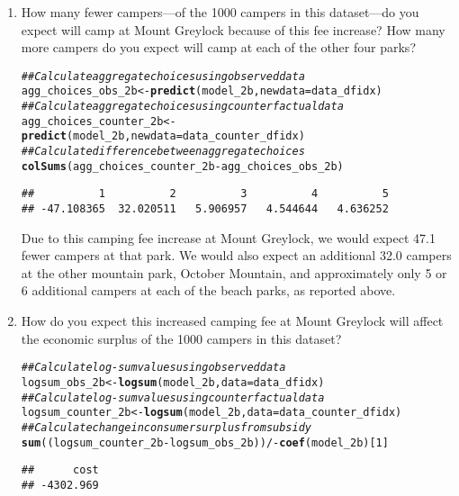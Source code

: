 \documentclass[11pt,letterpaper]{article}\usepackage[]{graphicx}\usepackage[]{color}
\makeatletter
\newcommand{\hlnum}[1]{\textcolor[rgb]{0.686,0.059,0.569}{#1}}%
\newcommand{\hlcom}[1]{\textcolor[rgb]{0.678,0.584,0.686}{\textit{#1}}}%
\newcommand{\hlopt}[1]{\textcolor[rgb]{0,0,0}{#1}}%
\newcommand{\hlstd}[1]{\textcolor[rgb]{0.345,0.345,0.345}{#1}}%
\newcommand{\hlkwb}[1]{\textcolor[rgb]{0.69,0.353,0.396}{#1}}%
\newcommand{\hlkwc}[1]{\textcolor[rgb]{0.333,0.667,0.333}{#1}}%
\newcommand{\hlkwd}[1]{\textcolor[rgb]{0.737,0.353,0.396}{\textbf{#1}}}%
\newenvironment{kframe}{%
 \def\at@end@of@kframe{}%
 \ifinner\ifhmode%
  \def\at@end@of@kframe{\end{minipage}}%
  \begin{minipage}{\columnwidth}%
 \fi\fi%
 \def\FrameCommand##1{\hskip\@totalleftmargin \hskip-\fboxsep
 \colorbox{shadecolor}{##1}\hskip-\fboxsep
     \hskip-\linewidth \hskip-\@totalleftmargin \hskip\columnwidth}%
 \MakeFramed {\advance\hsize-\width
   \@totalleftmargin\z@ \linewidth\hsize
   \@setminipage}}%
 {\par\unskip\endMakeFramed%
 \at@end@of@kframe}
\newenvironment{knitrout}{}{} %
\makeatother
\begin{document}
\begin{enumerate}[label=\alph*., leftmargin=*]
	\begin{enumerate}[label=\roman*.]
		\item How many fewer campers---of the 1000 campers in this dataset---do you expect will camp at Mount Greylock because of this fee increase? How many more campers do you expect will camp at each of the other four parks?

\begin{knitrout}
\color{fgcolor}\begin{kframe}
\begin{alltt}
\hlcom{## Calculate aggregate choices using observed data}
\hlstd{agg_choices_obs_2b} \hlkwb{<-} \hlkwd{predict}\hlstd{(model_2b,} \hlkwc{newdata} \hlstd{= data_dfidx)}
\hlcom{## Calculate aggregate choices using counterfactual data}
\hlstd{agg_choices_counter_2b} \hlkwb{<-} \hlkwd{predict}\hlstd{(model_2b,} \hlkwc{newdata} \hlstd{= data_counter_dfidx)}
\hlcom{## Calculate difference between aggregate choices}
\hlkwd{colSums}\hlstd{(agg_choices_counter_2b} \hlopt{-} \hlstd{agg_choices_obs_2b)}
\end{alltt}
\begin{verbatim}
##          1          2          3          4          5 
## -47.108365  32.020511   5.906957   4.544644   4.636252
\end{verbatim}
\end{kframe}
\end{knitrout}

		Due to this camping fee increase at Mount Greylock, we would expect 47.1 fewer campers at that park. We would also expect an additional 32.0 campers at the other mountain park, October Mountain, and approximately only 5 or 6 additional campers at each of the beach parks, as reported above.

		\item How do you expect this increased camping fee at Mount Greylock will affect the economic surplus of the 1000 campers in this dataset?

\begin{knitrout}
\color{fgcolor}\begin{kframe}
\begin{alltt}
\hlcom{## Calculate log-sum values using observed data}
\hlstd{logsum_obs_2b} \hlkwb{<-} \hlkwd{logsum}\hlstd{(model_2b,} \hlkwc{data} \hlstd{= data_dfidx)}
\hlcom{## Calculate log-sum values using counterfactual data}
\hlstd{logsum_counter_2b} \hlkwb{<-} \hlkwd{logsum}\hlstd{(model_2b,} \hlkwc{data} \hlstd{= data_counter_dfidx)}
\hlcom{## Calculate change in consumer surplus from subsidy}
\hlkwd{sum}\hlstd{((logsum_counter_2b} \hlopt{-} \hlstd{logsum_obs_2b))} \hlopt{/ -}\hlkwd{coef}\hlstd{(model_2b)[}\hlnum{1}\hlstd{]}
\end{alltt}
\begin{verbatim}
##      cost 
## -4302.969
\end{verbatim}
\end{kframe}
\end{knitrout}


\end{enumerate}
\end{enumerate}
\end{document}
